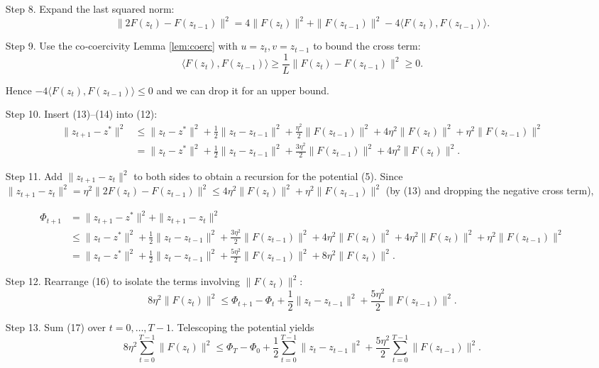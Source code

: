 \documentclass{article}
\begin{document}
\begin{enumerate}
\item[Step 8.] Expand the last squared norm:
\[
\|2F(z_{t})-F(z_{t-1})\|^{2}
=4\|F(z_{t})\|^{2}+\|F(z_{t-1})\|^{2}-4\langle F(z_{t}),F(z_{t-1})\rangle.
\tag{13}
\]

\item[Step 9.] Use the co‑coercivity Lemma \ref{lem:coerc} with \(u=z_{t},v=z_{t-1}\) to bound the cross term:
\[
\langle F(z_{t}),F(z_{t-1})\rangle
\ge \frac{1}{L}\|F(z_{t})-F(z_{t-1})\|^{2}
\ge 0.
\tag{14}
\]

Hence \(-4\langle F(z_{t}),F(z_{t-1})\rangle\le0\) and we can drop it for an upper bound.

\item[Step 10.] Insert (13)–(14) into (12):
\[
\begin{aligned}
\|z_{t+1}-z^{*}\|^{2}
&\le \|z_{t}-z^{*}\|^{2}
+\frac{1}{2}\|z_{t}-z_{t-1}\|^{2}
+\frac{\eta^{2}}{2}\|F(z_{t-1})\|^{2}
+4\eta^{2}\|F(z_{t})\|^{2}
+\eta^{2}\|F(z_{t-1})\|^{2}\\[1mm]
&= \|z_{t}-z^{*}\|^{2}
+\frac{1}{2}\|z_{t}-z_{t-1}\|^{2}
+ \frac{3\eta^{2}}{2}\|F(z_{t-1})\|^{2}
+4\eta^{2}\|F(z_{t})\|^{2}.
\end{aligned}
\tag{15}
\]

\item[Step 11.] Add \(\|z_{t+1}-z_{t}\|^{2}\) to both sides to obtain a recursion for the potential (5).  
Since \(\|z_{t+1}-z_{t}\|^{2}= \eta^{2}\|2F(z_{t})-F(z_{t-1})\|^{2}\le 4\eta^{2}\|F(z_{t})\|^{2}+ \eta^{2}\|F(z_{t-1})\|^{2}\) (by (13) and dropping the negative cross term),

\[
\begin{aligned}
\Phi_{t+1}
&=\|z_{t+1}-z^{*}\|^{2}+\|z_{t+1}-z_{t}\|^{2}\\
&\le \|z_{t}-z^{*}\|^{2}
+\frac{1}{2}\|z_{t}-z_{t-1}\|^{2}
+ \frac{3\eta^{2}}{2}\|F(z_{t-1})\|^{2}
+4\eta^{2}\|F(z_{t})\|^{2}
+4\eta^{2}\|F(z_{t})\|^{2}
+\eta^{2}\|F(z_{t-1})\|^{2}\\[1mm]
&= \|z_{t}-z^{*}\|^{2}
+\frac{1}{2}\|z_{t}-z_{t-1}\|^{2}
+ \frac{5\eta^{2}}{2}\|F(z_{t-1})\|^{2}
+8\eta^{2}\|F(z_{t})\|^{2}.
\end{aligned}
\tag{16}
\]

\item[Step 12.] Rearrange (16) to isolate the terms involving \(\|F(z_{t})\|^{2}\):
\[
8\eta^{2}\|F(z_{t})\|^{2}
\le \Phi_{t+1}-\Phi_{t}
+\frac{1}{2}\|z_{t}-z_{t-1}\|^{2}
+\frac{5\eta^{2}}{2}\|F(z_{t-1})\|^{2}.
\tag{17}
\]

\item[Step 13.] Sum (17) over \(t=0,\dots,T-1\).  Telescoping the potential yields
\[
8\eta^{2}\sum_{t=0}^{T-1}\|F(z_{t})\|^{2}
\le \Phi_{T}-\Phi_{0}
+\frac{1}{2}\sum_{t=0}^{T-1}\|z_{t}-z_{t-1}\|^{2}
+\frac{5\eta^{2}}{2}\sum_{t=0}^{T-1}\|F(z_{t-1})\|^{2}.
\tag{18}
\]


\end{enumerate}
\end{document}
